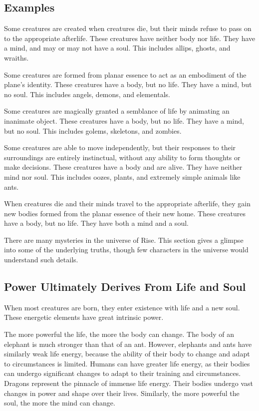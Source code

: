   \subsection{Examples}
    \begin{raggeditemize}
      \item Some creatures are created when creatures die, but their minds refuse to pass on to the appropriate afterlife. These creatures have neither body nor life. They have a mind, and may or may not have a soul. This includes allips, ghosts, and wraiths.
      \item Some creatures are formed from planar essence to act as an embodiment of the plane's identity. These creatures have a body, but no life. They have a mind, but no soul. This includes angels, demons, and elementals.
      \item Some creatures are magically granted a semblance of life by animating an inanimate object. These creatures have a body, but no life. They have a mind, but no soul. This includes golems, skeletons, and zombies.
      \item Some creatures are able to move independently, but their responses to their surroundings are entirely instinctual, without any ability to form thoughts or make decisions. These creatures have a body and are alive. They have neither mind nor soul. This includes oozes, plants, and extremely simple animals like ants.
      \item When creatures die and their minds travel to the appropriate afterlife, they gain new bodies formed from the planar essence of their new home. These creatures have a body, but no life. They have both a mind and a soul.
    \end{raggeditemize}


  There are many mysteries in the universe of Rise.
  This section gives a glimpse into some of the underlying truths, though few characters in the universe would understand such details.

  \subsection{Power Ultimately Derives From Life and Soul}
    When most creatures are born, they enter existence with life and a new soul.
    These energetic elements have great intrinsic power.

    The more powerful the life, the more the body can change.
    The body of an elephant is much stronger than that of an ant.
    However, elephants and ants have similarly weak life energy, because the ability of their body to change and adapt to circumstances is limited.
    Humans can have greater life energy, as their bodies can undergo significant changes to adapt to their training and circumstances.
    Dragons represent the pinnacle of immense life energy.
    Their bodies undergo vast changes in power and shape over their lives.
    Similarly, the more powerful the soul, the more the mind can change.

